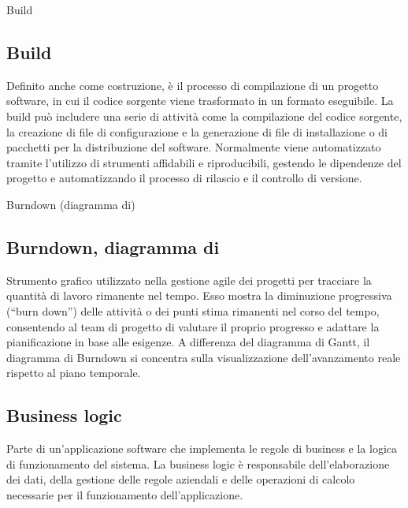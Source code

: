 \hypertarget{sec:build}{Build}
\subsection*{Build}
Definito anche come costruzione, è il processo di compilazione di un progetto software, in cui il codice sorgente viene trasformato in un 
formato eseguibile. La build può includere una serie di attività come la compilazione del codice sorgente, la creazione di file di 
configurazione e la generazione di file di installazione o di pacchetti per la distribuzione del software. Normalmente viene automatizzato 
tramite l’utilizzo di strumenti affidabili e riproducibili, gestendo le dipendenze del progetto e automatizzando il processo di rilascio e 
il controllo di versione.

\hypertarget{sec:diagramma_di_burndown}{Burndown (diagramma di)}
\subsection*{Burndown, diagramma di}
Strumento grafico utilizzato nella gestione agile dei progetti per tracciare la quantità di lavoro rimanente nel tempo. 
Esso mostra la diminuzione progressiva (“burn down”) delle attività o dei punti stima rimanenti nel corso del tempo, 
consentendo al team di progetto di valutare il proprio progresso e adattare la pianificazione in base alle esigenze. 
A differenza del diagramma di Gantt, il diagramma di Burndown si concentra sulla visualizzazione dell’avanzamento reale rispetto al piano temporale.

\hypertarget{sec:business_logic}{}
\subsection*{Business logic}
Parte di un'applicazione software che implementa le regole di business e la logica di funzionamento del sistema. La business logic è responsabile
dell'elaborazione dei dati, della gestione delle regole aziendali e delle operazioni di calcolo necessarie per il funzionamento dell'applicazione.


\newpage




\section{}

\hypertarget{sec:Camel Case}{}
